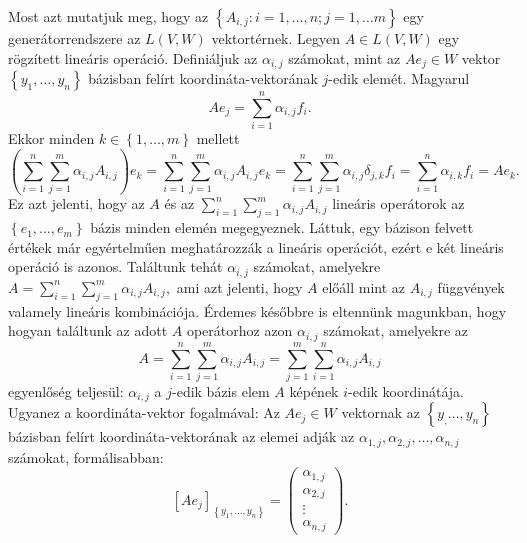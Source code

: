 \documentclass[9pt, a4paper, showtrims]{memoir}
\makeatletter
\renewenvironment{proof}[1][\proofname]
    {\par\pushQED{\qed}%
    \normalfont \topsep6\p@\@plus6\p@\relax
    \trivlist
    \item[\hskip\labelsep
        \itshape
    #1\@addpunct{:}]\ignorespaces}
    {\popQED\endtrivlist\@endpefalse}
\theoremstyle{plain}
\theoremstyle{remark}
\theoremstyle{definition}
\makeatother
\begin{document}
\begin{proof}
    Most azt mutatjuk meg, hogy az $\left\{ A_{i,j}:i=1,\dots,n;j=1,\dots m \right\}$ egy
    generátorrendszere az $L\left( V,W \right)$ vektortérnek.
    Legyen $A\in L\left( V,W \right)$ egy rögzített lineáris operáció.
    Definiáljuk az $\alpha_{i,j}$ számokat, 
    mint az $Ae_{j}\in W$ vektor $\left\{ y_1,\dots,y_n \right\}$ bázisban felírt koordináta-vektorának 
    $j$-edik elemét. 
    Magyarul
    \[
        Ae_j=
        \sum_{i=1}^n\alpha_{i,j}f_i.
    \]
    Ekkor minden $k\in\left\{ 1,\dots,m \right\}$ mellett
    \[
        \left( \sum_{i=1}^n\sum_{j=1}^m\alpha_{i,j}A_{i,j} \right)e_k
        =
        \sum_{i=1}^n\sum_{j=1}^m\alpha_{i,j}A_{i,j}e_k 
        =
        \sum_{i=1}^n\sum_{j=1}^m\alpha_{i,j}\delta_{j,k}f_i
        =
        \sum_{i=1}^n\alpha_{i,k}f_i
        =Ae_k.
    \]
    Ez azt jelenti, hogy az $A$ és az 
    \begin{math}
        \sum_{i=1}^n\sum_{j=1}^m\alpha_{i,j}A_{i,j}
    \end{math}
    lineáris operátorok az $\left\{ e_1,\dots,e_m \right\}$ bázis minden elemén megegyeznek.
    Láttuk, egy bázison felvett értékek már egyértelműen meghatározzák a lineáris operációt,
    ezért e két lineáris operáció is azonos.
    Találtunk tehát $\alpha_{i,j}$ számokat, amelyekre
    \begin{math}
        A=
        \sum_{i=1}^n\sum_{j=1}^m\alpha_{i,j}A_{i,j},
    \end{math}
    ami azt jelenti, hogy $A$ előáll mint az $A_{i,j}$ függvények valamely lineáris kombinációja.
\end{proof}
Érdemes későbbre is eltennünk magunkban, 
hogy hogyan találtunk az adott $A$ operátorhoz azon $\alpha_{i,j}$ számokat, 
amelyekre az
\[
    A=
    \sum_{i=1}^n\sum_{j=1}^m\alpha_{i,j}A_{i,j}
    =
    \sum_{j=1}^m\sum_{i=1}^n\alpha_{i,j}A_{i,j}
\]
egyenlőség teljesül: 
$\alpha_{i,j}$ a $j$-edik bázis elem $A$ képének $i$-edik koordinátája.
Ugyanez a koordináta-vektor fogalmával: 
Az $Ae_j\in W$ vektornak az $\left\{ y_,\dots,y_n \right\}$ bázisban felírt koordináta-vektorának az elemei 
adják az $\alpha_{1,j},\alpha_{2,j},\dots,\alpha_{n,j}$ számokat, formálisabban:
\[
    \left[ Ae_j \right]_{\left\{ y_1,\dots,y_n \right\}}
    =
    \begin{pmatrix}
        \alpha_{1,j}\\ \alpha_{2,j}\\ \vdots \\ \alpha_{n,j}
    \end{pmatrix}.
\]
\end{document}
